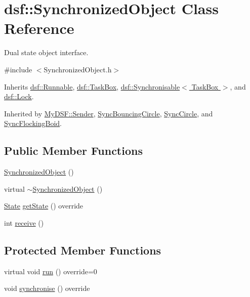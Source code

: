 \hypertarget{classdsf_1_1_synchronized_object}{}\section{dsf\+:\+:Synchronized\+Object Class Reference}
\label{classdsf_1_1_synchronized_object}


Dual state object interface.  




{\ttfamily \#include $<$Synchronized\+Object.\+h$>$}



Inherits \hyperlink{classdsf_1_1_runnable}{dsf\+::\+Runnable}, \hyperlink{classdsf_1_1_task_box}{dsf\+::\+Task\+Box}, \hyperlink{classdsf_1_1_synchronisable}{dsf\+::\+Synchronisable$<$ Task\+Box $>$}, and \hyperlink{classdsf_1_1_lock}{dsf\+::\+Lock}.



Inherited by \hyperlink{class_my_d_s_f_1_1_sender}{My\+D\+S\+F\+::\+Sender}, \hyperlink{class_sync_bouncing_circle}{Sync\+Bouncing\+Circle}, \hyperlink{class_sync_circle}{Sync\+Circle}, and \hyperlink{class_sync_flocking_boid}{Sync\+Flocking\+Boid}.

\subsection*{Public Member Functions}
\begin{DoxyCompactItemize}
\item 
\hyperlink{classdsf_1_1_synchronized_object_a3f1d2def677e6d814de4d0bd2aa3d95b}{Synchronized\+Object} ()
\item 
virtual \hyperlink{classdsf_1_1_synchronized_object_a0181452530628f24baad25eea03580f9}{$\sim$\+Synchronized\+Object} ()
\item 
\hyperlink{classdsf_1_1_runnable_a8eb63b21a0accc7a6a2a05f18e257991}{State} \hyperlink{classdsf_1_1_synchronized_object_a9fbf045eff345188935402ae576933eb}{get\+State} () override
\item 
int \hyperlink{classdsf_1_1_synchronized_object_a3ce496c6aaecc4b0ca3a4d09539a4920}{receive} ()
\end{DoxyCompactItemize}
\subsection*{Protected Member Functions}
\begin{DoxyCompactItemize}
\item 
virtual void \hyperlink{classdsf_1_1_synchronized_object_ae94875bd63d8071f8a563ac45ca7ccc2}{run} () override=0
\item 
void \hyperlink{classdsf_1_1_synchronized_object_a4e200d7b3508db98f09c6fe547f46cdb}{synchronise} () override
\end{DoxyCompactItemize}
